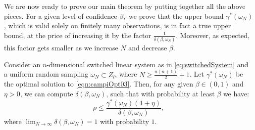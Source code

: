 We are now ready to prove our main theorem by putting together all the above pieces. For a given level of confidence $\beta,$ we prove that the upper bound $\gamma^*(\omega_N)$, which is valid solely on finitely many observations, is in fact a true upper bound, at the price of increasing it by the factor $\frac{1}{\delta(\beta, \omega_N)}$. Moreover, as expected, this factor gets smaller as we increase $N$ and decrease $\beta$.

\begin{theorem}\label{thm:mainTheorem}
Consider an $n$-dimensional switched linear system as in \eqref{eq:switchedSystem} and a uniform random sampling $\omega_N \subset Z_l$, where $N \geq \frac{n(n+1)}{2}+1$. Let $\gamma^*(\omega_N) $ be the optimal solution to \eqref{eqn:campiOpt03}. Then, for any given $\beta \in (0,1)$ and $\eta > 0$, we can compute $\delta(\beta, \omega_N)$, such that with probability at least $\beta$ we have:
$$\rho \leq \frac{\gamma^*(\omega_N) (1+ \eta)}{\delta(\beta, \omega_N)},$$
where $\lim_{N \to \infty}\delta(\beta, \omega_N) = 1$ with probability $1$.
\end{theorem}


